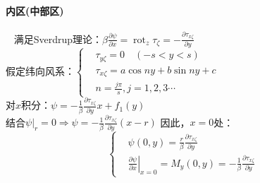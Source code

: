 \documentclass[a4paper,12pt]{article}
\begin{document}
    \paragraph{内区(中部区)}~{}
    满足Sverdrup理论：$\displaystyle \beta \frac{\partial \psi}{\partial x}=\operatorname{rot}_{z} \tau_{\zeta}=-\frac{\partial \tau_{x \zeta}}{\partial y}$\\
    假定纬向风系：$\displaystyle \left\{\begin{aligned}&\tau_{y\zeta}=0\quad(-s<y<s)\\&\tau_{x\zeta}=a\cos ny+b\sin ny+c\\&n=\frac{j\pi}{s},j=1,2,3\cdots \end{aligned}\right.$\\
    对$x$积分：$\displaystyle \psi=-\frac{1}{\beta}\frac{\partial \tau_{x\zeta}}{\partial y}x+f_1(y)$\\
    结合$\displaystyle \left.\psi\right|_r=0\Rightarrow \psi=-\frac{1}{\beta}\frac{\partial \tau_{x\zeta}}{\partial y}(x-r)$
    因此，$x=0$处：
    \[
        \left\{
            \begin{aligned}
                &\psi(0,y)=\frac{r}{\beta}\frac{\partial \tau_{x\zeta}}{\partial y}\\
                &\left.\frac{\partial \psi}{\partial x}\right|_{x=0}=M_{y}(0, y)=-\frac{1}{\beta} \frac{\partial \tau_{x \zeta}}{\partial y}
            \end{aligned}
        \right.
    \]
\end{document}
